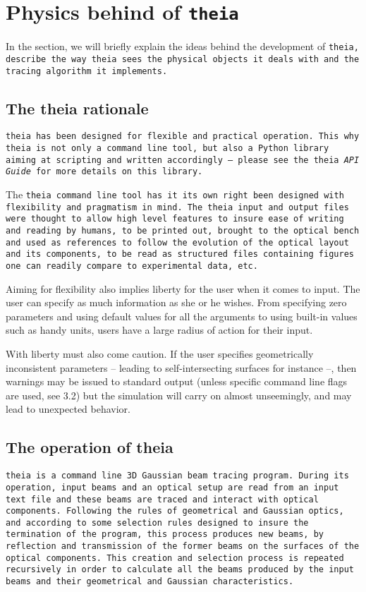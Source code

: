 \documentclass{article}
\begin{document}
\section{Physics behind of \tt{theia}}
In the section, we will briefly explain the ideas behind the development of \tt{theia}, describe the way \tt{theia} sees the physical objects it deals with and the tracing algorithm it implements.

\subsection{The theia rationale}
\tt{theia} has been designed for flexible and practical operation. This why \tt{theia} is not only a command line tool, but also a Python library aiming at scripting and written accordingly -- please see the theia \textit{API Guide} for more details on this library. 

The \tt{theia} command line tool has it its own right been designed with flexibility and pragmatism in mind. The \tt{theia} input and output files were thought to allow high level features to insure ease of writing and reading by humans, to be printed out, brought to the optical bench and used as references to follow the evolution of the optical layout and its components, to be read as structured files containing figures one can readily compare to experimental data, etc.

Aiming for flexibility also implies liberty for the user when it comes to input. The user can specify as much information as she or he wishes. From specifying zero parameters and using default values for all the arguments to using built-in values such as handy units, users have a large radius of action for their input.

With liberty must also come caution. If the user specifies geometrically inconsistent parameters -- leading to self-intersecting surfaces for instance --, then warnings may be issued to standard output (unless specific command line flags are used, see 3.2) but the simulation will carry on almost unseemingly, and may lead to unexpected behavior. 

\subsection{The operation of theia}
\tt{theia} is a command line 3D Gaussian beam tracing program. During its operation, input beams and an optical setup are read from an input text file and these beams are traced and interact with optical components. Following the rules of geometrical and Gaussian optics, and according to some selection rules designed to insure the termination of the program, this process produces new beams, by reflection and transmission of the former beams on the surfaces of the optical components. This creation and selection process is repeated recursively in order to calculate all the beams produced by the input beams and their geometrical and Gaussian characteristics. 
\end{document}
